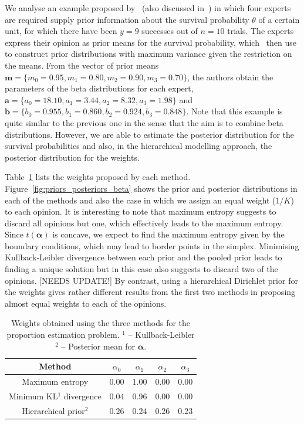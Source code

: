 \documentclass[a4paper, notitlepage, 10pt]{article}
\begin{document}
We analyse an example proposed by~\cite{savchuk1994} (also discussed in~\cite{rufo2012B}) in which four experts are required supply prior information about the survival probability $\theta$ of a certain unit, for which there have been $y = 9$ successes out of $n = 10$ trials.
The experts express their opinion as prior means for the survival probability, which~\cite{savchuk1994} then use to construct prior distributions with maximum variance given the restriction on the means.
From the vector of prior means $\mathbf{m} = \{ m_0 = 0.95, m_1 = 0.80, m_2 = 0.90, m_3 = 0.70 \}$, the authors obtain the parameters of the beta distributions for each expert,  $\mathbf{a} = \{ a_0 = 18.10, a_1 = 3.44 , a_2 = 8.32, a_3 = 1.98 \}$ and  $\mathbf{b} = \{ b_0 = 0.955 , b_1 = 0.860, b_2 = 0.924, b_3 = 0.848\}$.
Note that this example is quite similar to the previous one in the sense that the aim is to combine beta distributions. 
However, we are able to estimate the posterior distribution for the survival probabilities and also, in the hierarchical modelling approach, the posterior distribution for the weights.

Table~\ref{tab:alphasBeta} lists the weights proposed by each method.
Figure~\ref{fig:priors_posteriors_beta} shows the prior and posterior distributions in each of the methods and also the case in which we assign an equal weight ($1/K$) to each opinion.
It is interesting to note that maximum entropy suggests to discard all opinions but one, which effectively leads to the maximum entropy.
Since $t(\boldsymbol\alpha)$ is concave, we expect to find the maximum entropy given by the boundary conditions, which may lead to border points in the simplex.
Minimising Kullback-Leibler divergence between each prior and the pooled prior leads to finding a unique solution but in this case also suggests to discard two of the opinions. [NEEDS UPDATE!]
By contrast, using a hierarchical Dirichlet prior for the weights gives rather different results from the first two methods in proposing almost equal weights to each of the opinions.

\begin{table}[ht]
\caption{Weights obtained using the three methods for the proportion estimation problem. $^1$ -- Kullback-Leibler $^2$ -- Posterior mean for $\boldsymbol\alpha$.}
\centering
\begin{tabular}{ccccc}
  \hline
Method  & $\alpha_0$ & $\alpha_1$ & $\alpha_2$ & $\alpha_3$ \\ 
  \hline
Maximum entropy & 0.00 & 1.00 & 0.00 & 0.00 \\ 
Minimum KL$^1$ divergence& 0.04 & 0.96 & 0.00 & 0.00 \\ 
Hierarchical prior$^2$ & 0.26 & 0.24 & 0.26 & 0.23 \\ 
   \hline
\end{tabular}
\label{tab:alphasBeta}
\end{table}
\end{document}
